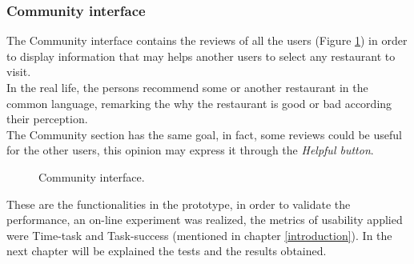 \subsubsection{Community interface}

The Community interface contains the reviews of all the users  
(Figure  \ref{fig:community}) in order to display information that may helps
another users to select any restaurant to visit. \\In the real life, the
persons recommend some or another restaurant in the common  language,
remarking the why the restaurant is good or bad according  their
perception. \\The Community section has the same goal, in fact,  some
reviews could be useful for the other users, this opinion may  express
it through the \textit{Helpful button}.
\begin{figure}
\captionsetup{font=footnotesize}
\centering
{}
\caption{Community interface.}
\label{fig:community}   
\end{figure}
These are the functionalities in the prototype, in order to validate
the performance, an on-line experiment was realized, the metrics 
of usability applied were Time-task and Task-success (mentioned 
in chapter  \ref{introduction}). In the next chapter will be 
explained the tests and the results obtained.







